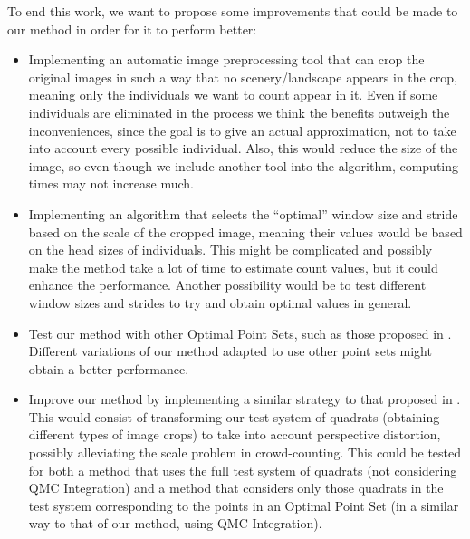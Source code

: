 To end this work, we want to propose some improvements that could be made to our method in order for it to perform better:
\begin{itemize}
    \item Implementing an automatic image preprocessing tool that can crop the original images in such a way that no scenery/landscape appears in the crop, meaning only the individuals we want to count appear in it. %
    Even if some individuals are eliminated in the process we think the benefits outweigh the inconveniences, since the goal is to give an actual approximation, not to take into account every possible individual. Also, this would reduce the size of the image, so even though we include another tool into the algorithm, computing times may not increase much. 
    \item Implementing an algorithm that selects the ``optimal'' window size and stride based on the scale of the cropped image, meaning their values would be based on the head sizes of individuals. This might be complicated and possibly make the method take a lot of time to estimate count values, but it could enhance the performance. Another possibility would be to test different window sizes and strides to try and obtain optimal values in general.
    \item Test our method with other Optimal Point Sets, such as those proposed in \cite{NewPointSets}. Different variations of our method adapted to use other point sets might obtain a better performance.
    \item Improve our method by implementing a similar strategy to that proposed in \cite{Perspectiva}. This would consist of transforming our test system of quadrats (obtaining different types of image crops) to take into account perspective distortion, possibly alleviating the scale problem in crowd-counting. This could be tested for both a method that uses the full test system of quadrats (not considering QMC Integration) and a method that considers only those quadrats in the test system corresponding to the points in an Optimal Point Set (in a similar way to that of our method, using QMC Integration).
\end{itemize}

